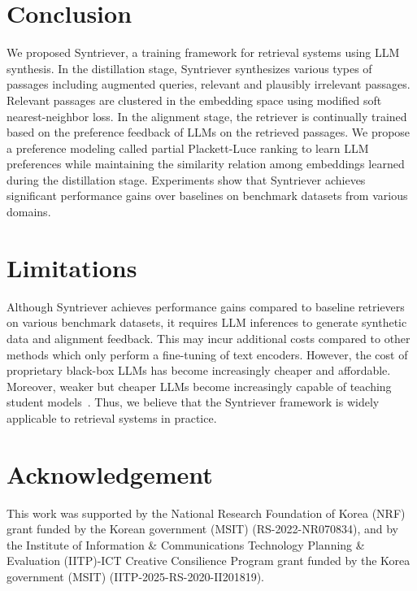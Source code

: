 \section{Conclusion}
We proposed Syntriever, a training framework for retrieval systems using LLM synthesis. 
In the distillation stage, Syntriever synthesizes various types of passages including augmented queries, relevant and plausibly irrelevant passages. Relevant passages are clustered in the embedding space using modified soft nearest-neighbor loss. In the alignment stage, the retriever is continually trained based on the preference feedback of LLMs on the retrieved passages. We propose a preference modeling called partial Plackett-Luce ranking to learn LLM preferences while maintaining the similarity relation among embeddings learned during the distillation stage. Experiments show that Syntriever achieves significant performance gains over baselines on benchmark datasets from various domains.

\section{Limitations}
Although Syntriever achieves performance gains compared to baseline retrievers on various benchmark datasets, it requires LLM inferences to generate synthetic data and alignment feedback. This may incur additional costs compared to other methods which only perform a fine-tuning of text encoders. 
However, the cost of proprietary black-box LLMs has become increasingly cheaper and affordable. Moreover, weaker but cheaper LLMs become increasingly capable of teaching student models~\cite{bansal2024smaller}. Thus, we believe that the Syntriever framework is widely applicable to retrieval systems in practice.

\section{Acknowledgement}
This work was supported by the National Research Foundation of Korea (NRF) grant funded by the Korean government (MSIT) (RS-2022-NR070834), and by the Institute of Information \& Communications Technology Planning \& Evaluation (IITP)-ICT Creative Consilience Program grant funded by the Korea government (MSIT) (IITP-2025-RS-2020-II201819).